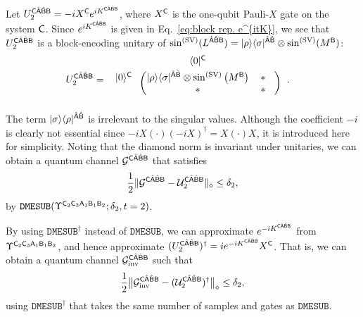 Let $U_2^{{\mathsf{C}}\hat{{\mathsf{A}}}\hat{{\mathsf{B}}}{\mathsf{B}}} = -iX^{\mathsf{C}} e^{iK^{{\mathsf{C}}\hat{{\mathsf{A}}}\hat{{\mathsf{B}}}{\mathsf{B}}}}$, where $X^{\mathsf{C}}$ is the one-qubit Pauli-$X$ gate on the system ${\mathsf{C}}$. Since $e^{iK^{{\mathsf{C}}\hat{{\mathsf{A}}}\hat{{\mathsf{B}}}{\mathsf{B}}}}$ is given in Eq.~\eqref{eq:block rep. e^{itK}}, we see that $U_2^{{\mathsf{C}}\hat{{\mathsf{A}}}\hat{{\mathsf{B}}}{\mathsf{B}}}$ is a block-encoding unitary of $\sin^{(\rm SV)}(L^{\hat{{\mathsf{A}}}\hat{{\mathsf{B}}}{\mathsf{B}}}) = |\rho\rangle\langle\sigma|^{\hat{{\mathsf{A}}}\hat{{\mathsf{B}}}} \otimes \sin^{(\rm SV)}(M^{\mathsf{B}})$:
\begin{align}
    U_2^{\sC\hat{\sA}\hat{\sB}\sB}
    &= \hspace{1mm}
\begin{blockarray}{ccc}
& \bra{0}^\sC &  \vspace{1mm}\\
\begin{block}{c(cc)}
  \ket{0}^\sC \hspace*{1mm} & \ketbra{\rho}{\sigma}^{\hat{\sA}\hat{\sB}}\otimes \sin^{(\rm SV)}\big(M^\sB\big) & \hspace{0mm} * \hspace{3mm}\\
  & * & \hspace{0mm} * \hspace{3mm}\\
\end{block}
\end{blockarray}\hspace{2.5mm}.
\end{align}
The term $|\sigma\rangle\langle\rho|^{\hat{{\mathsf{A}}}\hat{{\mathsf{B}}}}$ is irrelevant to the singular values.
Although the coefficient $-i$ is clearly not essential since $-iX(\cdot)(-iX)^\dag = X(\cdot)X$, it is introduced here for simplicity.
Noting that the diamond norm is invariant under unitaries, we can obtain a quantum channel ${\mathcal{G}}^{{\mathsf{C}}\hat{{\mathsf{A}}}\hat{{\mathsf{B}}}{\mathsf{B}}}$ that satisfies
\begin{equation}
\label{eq:matrix exponentiation of M}
    \frac{1}{2}\|{\mathcal{G}}^{{\mathsf{C}}\hat{{\mathsf{A}}}\hat{{\mathsf{B}}}{\mathsf{B}}} - {\mathcal{U}}_2^{{\mathsf{C}}\hat{{\mathsf{A}}}\hat{{\mathsf{B}}}{\mathsf{B}}}\|_\diamond \leq \delta_2,
\end{equation}
by $\mathtt{DMESUB}(\Upsilon^{{\mathsf{C}}_2{\mathsf{C}}_3{\mathsf{A}}_1{\mathsf{B}}_1{\mathsf{B}}_2}; \delta_2, t=2)$.


By using $\mathtt{DMESUB}^\dag$ instead of $\mathtt{DMESUB}$, we can approximate $e^{-iK^{{\mathsf{C}}\hat{{\mathsf{A}}}\hat{{\mathsf{B}}}{\mathsf{B}}}}$ from $\Upsilon^{{\mathsf{C}}_2{\mathsf{C}}_3{\mathsf{A}}_1{\mathsf{B}}_1{\mathsf{B}}_2}$, and hence approximate $(U_2^{{\mathsf{C}}\hat{{\mathsf{A}}}\hat{{\mathsf{B}}}{\mathsf{B}}})^\dag = ie^{-iK^{{\mathsf{C}}\hat{{\mathsf{A}}}\hat{{\mathsf{B}}}{\mathsf{B}}}} X^{\mathsf{C}}$. That is, we can obtain a quantum channel ${\mathcal{G}}_{\rm inv}^{{\mathsf{C}}\hat{{\mathsf{A}}}\hat{{\mathsf{B}}}{\mathsf{B}}}$ such that
\begin{align}
\label{inteq:92}
    \frac{1}{2}\big\|{\mathcal{G}}_{\rm inv}^{{\mathsf{C}}\hat{{\mathsf{A}}}\hat{{\mathsf{B}}}{\mathsf{B}}} - ({\mathcal{U}}_2^{{\mathsf{C}}\hat{{\mathsf{A}}}\hat{{\mathsf{B}}}{\mathsf{B}}})^\dag\big\|_\diamond \leq \delta_2,    
\end{align}
using $\mathtt{DMESUB}^\dag$ that takes the same number of samples and gates as $\mathtt{DMESUB}$.


